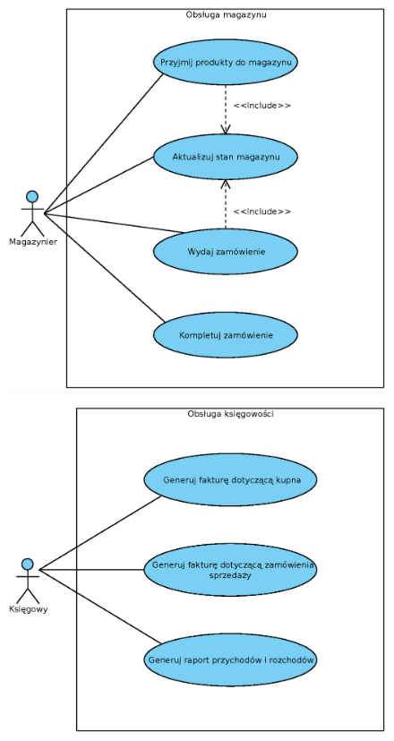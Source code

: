 
\begin{figure}[H]
	\centering
	\includegraphics[width=.8\textwidth]{img/UC/magazyn.eps}
\end{figure}

\begin{figure}[H]
	\centering
	\includegraphics[width=.8\textwidth]{img/UC/ksiegowosc.eps}
\end{figure}